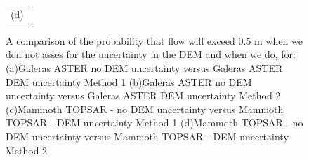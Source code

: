 \documentclass[12pt]{article}
\begin{document}
\begin{figure}[H]
\begin{minipage}{0.6\textwidth}
\begin{tabular}{c}
        (d)
        \end{tabular}
    \end{minipage} 
\caption{A comparison of the probability that flow will exceed 0.5 m when we don not asses for the uncertainty in the DEM and when we do, for: (a)Galeras ASTER no DEM uncertainty versus Galeras ASTER DEM uncertainty Method 1
(b)Galeras ASTER no DEM uncertainty versus Galeras ASTER DEM uncertainty Method 2
(c)Mammoth TOPSAR - no DEM uncertainty versus Mammoth TOPSAR - DEM uncertainty Method 1
(d)Mammoth TOPSAR - no DEM uncertainty versus Mammoth TOPSAR - DEM uncertainty Method 2}
\label{fig9}  
\end{figure}
\end{document}
